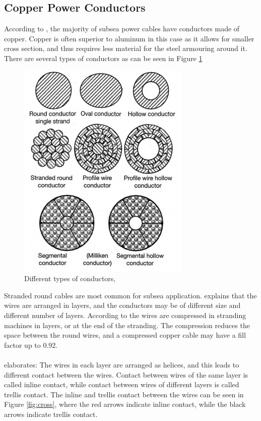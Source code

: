 \subsection{Copper Power Conductors}
  According to \cite{Worzyk}, the majority of subsea power cables have conductors made of copper. Copper is often superior to aluminum in this case as it allows for smaller cross section, and thus requires less material for the steel armouring around it. There are several  types of conductors as can be seen in Figure \ref{fig:conductors}
  \begin{figure}[H]
\centering
\includegraphics[scale=0.5]{figures/conductors}
\caption[$\; \:$Different types of conductors]{Different types of conductors, \cite{Worzyk} }
 \label{fig:conductors}
\end{figure}
 Stranded round cables are most common for subsea application. \cite{Nasution2013} explains that the wires are arranged in layers, and the conductors may be of different size and different number of layers. According to \cite{Worzyk} the wires are compressed in stranding machines in layers, or at the end of the stranding. The compression reduces the space between the round wires, and a compressed copper cable may have a fill factor up to 0.92. 
  \\\\
 \cite{Nasution2013} elaborates: The wires in each layer are arranged as helices, and this leads to different contact between the wires. Contact between wires of the same layer is called inline contact, while contact between wires of different layers is called trellis contact. The inline and trellis contact between the wires can be seen in Figure \ref{fig:cross}, where the red arrows indicate inline contact, while the black arrows indicate trellis contact. 
